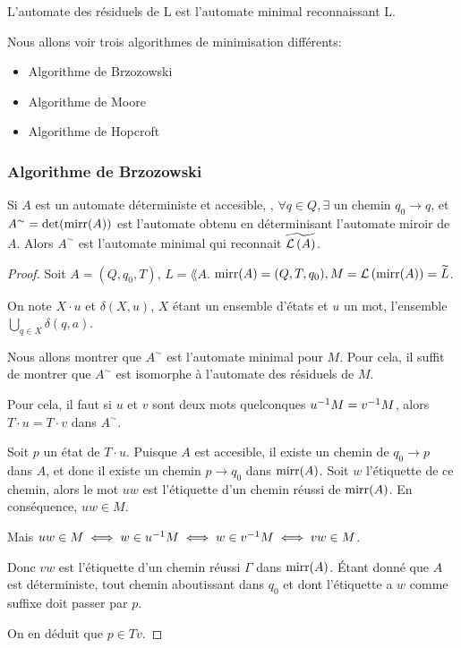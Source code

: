 L'automate des résiduels de L est l'automate minimal reconnaissant L.


Nous allons voir trois algorithmes de minimisation différents:
\begin{itemize}
	\item Algorithme de Brzozowski
	\item Algorithme de Moore
	\item Algorithme de Hopcroft
\end{itemize}


\subsubsection{Algorithme de Brzozowski}

\begin{prop}
	Si $A$ est un automate déterministe et accesible, \ie, $\forall q \in Q, \exists \text{ un chemin } q_0 \to q$,
	et  $A^ {\sim} = \text{det} (\text{mirr}(A)) $ est l'automate obtenu en déterminisant l'automate miroir de $A$. Alors
	$A^{\sim}$ est l'automate minimal qui reconnait $\widetilde{\mathcal{L}\left(A\right)}$.
\end{prop}


\begin{proof}
	Soit $A = (Q, q_0, T)$, $L = \lang A$. $\text{mirr} (A) = (Q, T, q_0), M = \mathcal{L}\left(\text{mirr} (A)\right) = \widetilde{L}$.

	On note $X \cdot u$ et $\delta (X,u)$, $X$ étant un ensemble d'états et $u$ un mot, l'ensemble $\bigcup\limits_{q \in X} \delta (q,a)$.

	Nous allons montrer que $A^{\sim}$ est l'automate minimal pour $M$. Pour cela, il suffit de montrer que $A^{\sim}$
	est isomorphe à l'automate des résiduels de $M$.

	Pour cela, il faut \mq si $u$ et $v$ sont deux mots quelconques \tq $u^{-1} M = v^{-1} M$, alors $T \cdot u =  T \cdot v$ dans $A^{\sim}$.

	Soit $p$ un état de $T \cdot u$. Puisque $A$ est accesible, il existe un chemin de $q_0 \to p$ dans $A$, et donc il existe un chemin $p \to q_0$ dans $\text{mirr}(A)$.
	Soit $w$ l'étiquette de ce chemin, alors le mot $uw$ est l'étiquette d'un chemin réussi de $\text{mirr} (A)$. En conséquence, $uw \in M$.

	Mais $uw\in M \iff w \in u^{-1} M \iff w\in v^{-1} M \iff vw \in M$.

	Donc $vw$ est l'étiquette d'un chemin réussi $\Gamma$ dans $\text{mirr} (A)$. Étant donné que $A$ est déterministe, tout chemin aboutissant dans $q_0$
	et dont l'étiquette a $w$ comme suffixe doit passer par $p$.

	On en  déduit que $p \in Tv$.
\end{proof}


